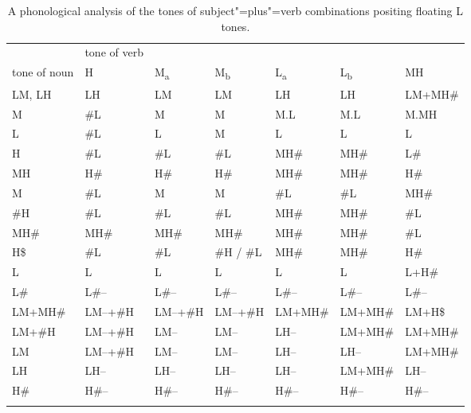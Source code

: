 \begin{sidewaystable}[p]
	\caption{\label{tab:analysisofthetonesofsubjectverbcombinationspositingfloatingLtones}A phonological analysis of the tones of subject"=plus"=verb combinations positing floating L tones.}
	\begin{tabularx}{\textheight}{ l Q Q Q Q Q Q }
		\lsptoprule
		& tone of verb & & & & &\\ 
		tone of noun & H & M\textsubscript{a} & M\textsubscript{b} & L\textsubscript{a} & L\textsubscript{b} & MH\\ \midrule
		LM, LH & LH & LM & LM & LH & LH & LM+MH\#\\
		M & \shadedcell \#L & M & M & M.L & M.L & M.MH\\
		L & \shadedcell \#L & L & M & L & L & L\\
		H & \shadedcell \#L & \shadedcell \#L & \shadedcell \#L & MH\# & MH\# & L\#\\
		MH & H\# & H\# & H\# & MH\# & MH\# & H\#\\ \addlinespace \hdashline \addlinespace
		M & \shadedcell \#L & M & M & \shadedcell \#L & \shadedcell \#L & MH\#\\
		\#H & \shadedcell \#L & \shadedcell \#L & \shadedcell \#L & MH\# & MH\# & \shadedcell \#L\\
		MH\# & MH\# & MH\# & MH\# & MH\# & MH\# & \shadedcell \#L\\
		H\$ & \shadedcell \#L & \shadedcell \#L & \lshadedcell \#H / \#L & MH\# & MH\# & H\#\\
		L & L & L & L & L & L & L+H\#\\
		L\# & L\#-- & L\#-- & L\#-- & L\#-- & L\#-- & L\#--\\
		LM+MH\# & LM--+\#H  & LM--+\#H  & LM--+\#H  & LM+MH\# & LM+MH\# & LM+H\$\\
		LM+\#H & LM--+\#H  & LM-- & LM-- & LH-- & LM+MH\# & LM+MH\#\\
		LM & LM--+\#H  & LM-- & LM-- & LH-- & LH-- & LM+MH\#\\
		LH & LH-- & LH-- & LH-- & LH-- & LM+MH\# & LH--\\
		H\# & H\#-- & H\#-- & H\#-- & H\#-- & H\#-- & H\#--\\
		\lspbottomrule
	\end{tabularx}
\end{sidewaystable}

